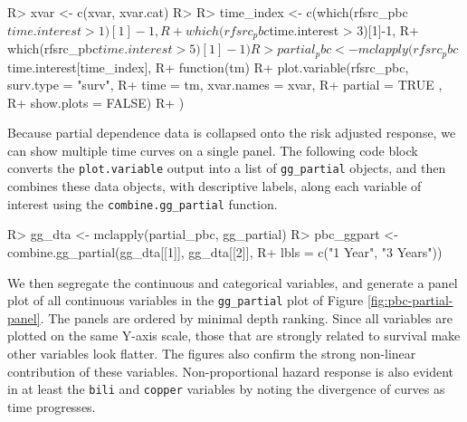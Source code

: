\documentclass[article, nojss]{jss}
\begin{document}
\begin{Schunk}
\begin{Sinput}
R> xvar <- c(xvar, xvar.cat)
R>
R> time_index <- c(which(rfsrc_pbc$time.interest > 1)[1]-1,
R+                 which(rfsrc_pbc$time.interest > 3)[1]-1,
R+                 which(rfsrc_pbc$time.interest > 5)[1]-1)
R> partial_pbc <- mclapply(rfsrc_pbc$time.interest[time_index],
R+                         function(tm){
R+                           plot.variable(rfsrc_pbc, surv.type = "surv",
R+                                         time = tm, xvar.names = xvar,
R+                                         partial = TRUE ,
R+                                         show.plots = FALSE)
R+                         })
\end{Sinput}
\end{Schunk}

Because partial dependence data is collapsed onto the risk adjusted
response, we can show multiple time curves on a single panel. The
following code block converts the \texttt{plot.variable} output into a
list of \texttt{gg\_partial} objects, and then combines these data
objects, with descriptive labels, along each variable of interest using
the \texttt{combine.gg\_partial} function.

\begin{Schunk}
\begin{Sinput}
R> gg_dta <- mclapply(partial_pbc, gg_partial)
R> pbc_ggpart <- combine.gg_partial(gg_dta[[1]], gg_dta[[2]],
R+                                  lbls = c("1 Year", "3 Years"))
\end{Sinput}
\end{Schunk}

We then segregate the continuous and categorical variables, and generate
a panel plot of all continuous variables in the \texttt{gg\_partial}
plot of Figure \ref{fig:pbc-partial-panel}. The panels are ordered by
minimal depth ranking. Since all variables are plotted on the same
Y-axis scale, those that are strongly related to survival make other
variables look flatter. The figures also confirm the strong non-linear
contribution of these variables. Non-proportional hazard response is
also evident in at least the \texttt{bili} and \texttt{copper} variables
by noting the divergence of curves as time progresses.
\end{document}
